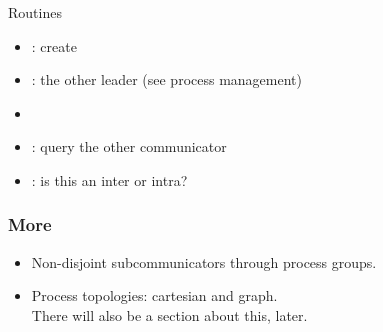 \begin{mpithree}
\begin{frame}[containsverbatim]{Routines}
  \label{sl:intercomm-routines}
  \begin{itemize}
  \item
    : create
  \item {}: the other leader (see process management)
  \item {} 
  \item {}: query the other communicator
  \item {}: is this an inter or intra?
  \end{itemize}
\end{frame}
\end{mpithree}

\begin{frame}[containsverbatim]\frametitle{More}
  \begin{itemize}
  \item Non-disjoint subcommunicators through process groups.
  \item Process topologies: cartesian and graph.\\
    There will also be a section about this, later.
  \end{itemize}
\end{frame}

\endinput

\begin{frame}[containsverbatim]\frametitle{}
\begin{lstlisting}
  
\end{lstlisting}
\end{frame}

